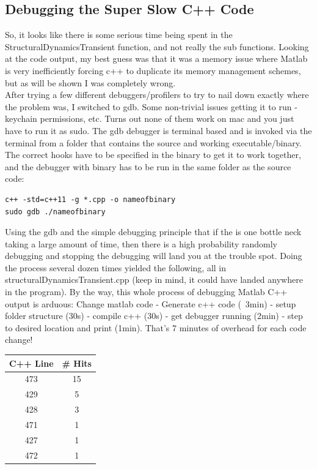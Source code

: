 \documentclass{article}
\begin{document}
\subsection{Debugging the Super Slow C++ Code}

So, it looks like there is some serious time being spent in the StructuralDynamicsTransient function, and not really the sub functions.  Looking at the code output, my best guess was that it was a memory issue where Matlab is very inefficiently forcing c++ to duplicate its memory management schemes, but as will be shown I was completely wrong.\\

After trying a few different debuggers/profilers to try to nail down exactly where the problem was, I switched to gdb. Some non-trivial issues getting it to run - keychain permissions, etc. Turns out none of them work on mac and you just have to run it as sudo.  The gdb debugger is terminal based and is invoked via the terminal from a folder that contains the source and working executable/binary.  The correct hooks have to be specified in the binary to get it to work together, and the debugger with binary has to be run in the same folder as the source code:

\begin{verbatim}
c++ -std=c++11 -g *.cpp -o nameofbinary
sudo gdb ./nameofbinary
\end{verbatim}

Using the gdb and the simple debugging principle that if the is one bottle neck taking a large amount of time, then there is a high probability randomly debugging and stopping the debugging will land you at the trouble spot.  Doing the process several dozen times yielded the following, all in structuralDynamicsTransient.cpp (keep in mind, it could have landed anywhere in the program).  By the way, this whole process of debugging Matlab C++ output is arduous: Change matlab code - Generate c++ code (~3min) - setup folder structure (30s) - compile c++ (30s) - get debugger running (2min) - step to desired location and print (1min). That's 7 minutes of overhead for each code change!

\begin{center}
\begin{tabular}{|c c|}
\hline
C++ Line & \# Hits \\
\hline
473 & 15 \\
\hline
429 & 5 \\
\hline
428 & 3 \\
\hline
471 & 1 \\
\hline
427 & 1 \\
\hline
472 & 1 \\
\hline

\end{tabular}
\end{center}
\end{document}

